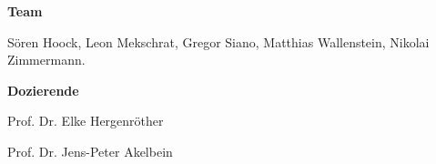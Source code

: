 \documentclass[%
textcolor=radacc_lightBlue,	%
pagecolor=radacc_darkblue,		%
]{../estposter}
\begin{document}
\begin{textblock}{12.5}
\par\medskip

\color{radacc_blue}
\textbf{Team}
\par\smallskip

\color{radacc_lightBlue}
Sören Hoock, Leon Mekschrat, Gregor Siano, Matthias Wallenstein, Nikolai Zimmermann.


\par\smallskip


\color{radacc_blue}
\textbf{Dozierende}
\par\smallskip

\color{radacc_lightBlue}
Prof. Dr. Elke Hergenröther

\color{radacc_lightBlue}
Prof. Dr. Jens-Peter Akelbein
\par\smallskip

\par\medskip


%

\par\bigskip
\par\bigskip
\par\bigskip





\end{textblock}
\end{document}
